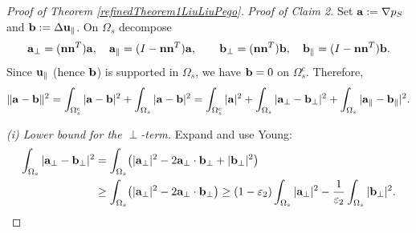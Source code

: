 \documentclass{article}
\theoremstyle{definition}                   %
\begin{document}
\begin{proof}[Proof of Theorem \ref{refinedTheorem1LiuLiuPego}]
\noindent
\emph{Proof of Claim 2.}
Set ${\bf a}:=\nabla p_S$ and ${\bf b}:=\Delta{\bf u}_\parallel$.
On $\Omega_s$ decompose
\[
{\bf a}_\perp=({\bf n}{\bf n}^T){\bf a},\quad {\bf a}_\parallel=(I-{\bf n}{\bf n}^T){\bf a},\qquad
{\bf b}_\perp=({\bf n}{\bf n}^T){\bf b},\quad {\bf b}_\parallel=(I-{\bf n}{\bf n}^T){\bf b}.
\]
Since ${\bf u}_\parallel$ (hence ${\bf b}$) is supported in $\Omega_s$, we have
${\bf b}=0$ on $\Omega_s^c$. Therefore,
\begin{align}
\|{\bf a}-{\bf b}\|^2
=\int_{\Omega_s^c}|{\bf a}-{\bf b}|^2+\int_{\Omega_s}|{\bf a}-{\bf b}|^2 
=\int_{\Omega_s^c}|{\bf a}|^2+\int_{\Omega_s}|{\bf a}_\perp-{\bf b}_\perp|^2
+\int_{\Omega_s}|{\bf a}_\parallel-{\bf b}_\parallel|^2 .
\label{eq:split}
\end{align}

\emph{(i) Lower bound for the $\perp$-term.}
Expand and use Young:
\begin{align}
\int_{\Omega_s}|{\bf a}_\perp-{\bf b}_\perp|^2
&=\int_{\Omega_s}\bigl(|{\bf a}_\perp|^2-2{\bf a}_\perp\cdot{\bf b}_\perp+|{\bf b}_\perp|^2\bigr) \notag\\
&\ge \int_{\Omega_s}\bigl(|{\bf a}_\perp|^2-2{\bf a}_\perp\cdot{\bf b}_\perp\bigr) 
\ge (1-\varepsilon_2)\int_{\Omega_s}|{\bf a}_\perp|^2
-\frac{1}{\varepsilon_2}\int_{\Omega_s}|{\bf b}_\perp|^2 .
\label{eq:perp}
\end{align}


\end{proof}
\end{document}
